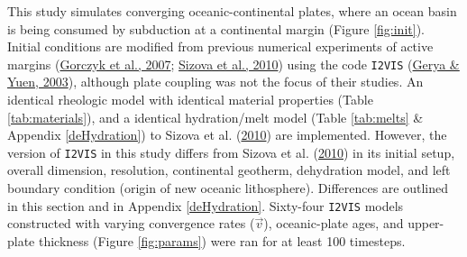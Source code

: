 This study simulates converging oceanic-continental plates, where an ocean basin is being consumed by subduction at a continental margin (Figure \ref{fig:init}). Initial conditions are modified from previous numerical experiments of active margins (\protect\hyperlink{ref-gorczyk2007}{Gorczyk et al., 2007}; \protect\hyperlink{ref-sizova2010}{Sizova et al., 2010}) using the code \texttt{I2VIS} (\protect\hyperlink{ref-gerya2003}{Gerya \& Yuen, 2003}), although plate coupling was not the focus of their studies. An identical rheologic model with identical material properties (Table \ref{tab:materials}), and a identical hydration/melt model (Table \ref{tab:melts} \& Appendix \ref{deHydration}) to Sizova et al. (\protect\hyperlink{ref-sizova2010}{2010}) are implemented. However, the version of \texttt{I2VIS} in this study differs from Sizova et al. (\protect\hyperlink{ref-sizova2010}{2010}) in its initial setup, overall dimension, resolution, continental geotherm, dehydration model, and left boundary condition (origin of new oceanic lithosphere). Differences are outlined in this section and in Appendix \ref{deHydration}. Sixty-four \texttt{I2VIS} models constructed with varying convergence rates (\(\vec{v}\)), oceanic-plate ages, and upper-plate thickness (Figure \ref{fig:params}) were ran for at least 100 timesteps.

